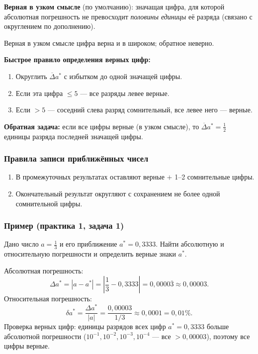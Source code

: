 \textbf{Верная в узком смысле} (по умолчанию): значащая цифра, для которой абсолютная погрешность не превосходит \textit{половины единицы} её разряда (связано с округлением по дополнению).

Верная в узком смысле цифра верна и в широком; обратное неверно.

\textbf{Быстрое правило определения верных цифр:}
\begin{enumerate}
    \item Округлить $\overline{\Delta} a^*$ с избытком до одной значащей цифры.
    \item Если эта цифра $\leq 5$ --- все разряды левее верные.
    \item Если $> 5$ --- соседний слева разряд сомнительный, все левее него --- верные.
\end{enumerate}

\textbf{Обратная задача:} если все цифры верные (в узком смысле), то $\overline{\Delta} a^* = \frac{1}{2}$ единицы разряда последней значащей цифры.

\subsubsection*{Правила записи приближённых чисел}

\begin{enumerate}
    \item В промежуточных результатах оставляют верные $+$ 1--2 сомнительные цифры.
    \item Окончательный результат округляют с сохранением не более одной сомнительной цифры.
\end{enumerate}

\subsubsection*{Пример (практика 1, задача 1)}

Дано число $a = \frac{1}{3}$ и его приближение $a^* = 0{,}3333$. Найти абсолютную и относительную погрешности и определить верные знаки $a^*$.

Абсолютная погрешность:
\[
    \Delta a^* = |a - a^*| = \left|\frac{1}{3} - 0{,}3333\right| = 0{,}0000\overline{3} \approx 0{,}00003.
\]
Относительная погрешность:
\[
    \delta a^* = \frac{\Delta a^*}{|a|} = \frac{0{,}00003}{1/3} \approx 0{,}0001 = 0{,}01\%.
\]
Проверка верных цифр: единицы разрядов всех цифр $a^* = 0{,}3333$ больше абсолютной погрешности ($10^{-1}, 10^{-2}, 10^{-3}, 10^{-4}$ --- все $> 0{,}00003$), поэтому все цифры верные.

